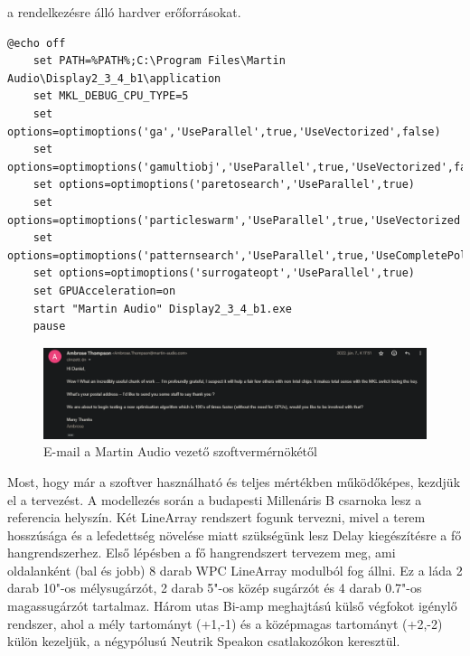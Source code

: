 a rendelkezésre álló hardver erőforrásokat.
\begin{lstlisting}[caption={A Display 2.3.4 b1 indító ".bat" scriptje AMD Ryzen processzorokhoz}, label=batcode, xleftmargin=\parindent]
    @echo off
    set PATH=%PATH%;C:\Program Files\Martin Audio\Display2_3_4_b1\application
    set MKL_DEBUG_CPU_TYPE=5
    set options=optimoptions('ga','UseParallel',true,'UseVectorized',false)
    set options=optimoptions('gamultiobj','UseParallel',true,'UseVectorized',false)
    set options=optimoptions('paretosearch','UseParallel',true)
    set options=optimoptions('particleswarm','UseParallel',true,'UseVectorized',false)
    set options=optimoptions('patternsearch','UseParallel',true,'UseCompletePoll',true,'UseVectorized',false)
    set options=optimoptions('surrogateopt','UseParallel',true)
    set GPUAcceleration=on
    start "Martin Audio" Display2_3_4_b1.exe
    pause
\end{lstlisting}
\begin{figure}[H]
    \centering
    \includegraphics[width=\textwidth, keepaspectratio]{figures/ambrose_email.png}
    \caption{E-mail a Martin Audio vezető szoftvermérnökétől}
    \label{fig:ambrose_email}
\end{figure}
Most, hogy már a szoftver használható és teljes mértékben működőképes, kezdjük el a tervezést.
A modellezés során a budapesti Millenáris B csarnoka lesz a referencia helyszín. Két LineArray rendszert fogunk
tervezni, mivel a terem hosszúsága és a lefedettség növelése miatt szükségünk lesz Delay kiegészítésre a fő hangrendszerhez.
Első lépésben a fő hangrendszert tervezem meg, ami oldalanként (bal és jobb) 8 darab WPC LineArray modulból fog állni.
Ez a láda 2 darab 10"-os mélysugárzót, 2 darab 5"-os közép sugárzót és 4 darab 0.7"-os magassugárzót tartalmaz.
Három utas Bi-amp meghajtású külső végfokot igénylő rendszer, ahol a mély tartományt (+1,-1) és a középmagas tartományt (+2,-2) külön kezeljük,
a négypólusú Neutrik Speakon csatlakozókon keresztül. 
